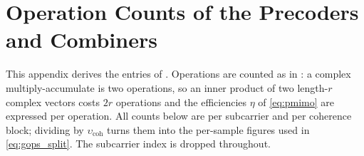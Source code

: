 \appendices
{}
\section{Operation Counts of the Precoders and Combiners}
\label{app:complexity}

This appendix derives the entries of . Operations are
counted as in \cite{peschiera2026fr3}: a complex multiply-accumulate is two
operations, so an inner product of two length-$r$ complex vectors costs $2r$
operations and the efficiencies $\eta$ of \eqref{eq:pmimo} are expressed per
operation. All counts below are per subcarrier and per coherence block; dividing
by $\upsilon_{\mathrm{coh}}$ turns them into the per-sample figures used in
\eqref{eq:gops_split}. The subcarrier index is dropped throughout.

